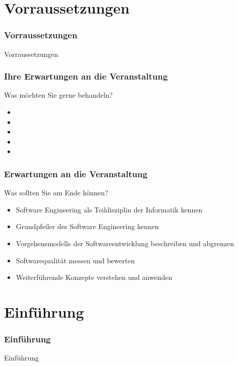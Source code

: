 
\section{Vorraussetzungen}
\begin{frame}[fragile]
	\frametitle{Vorraussetzungen}
\huge Vorraussetzungen
\end{frame}

\begin{frame}
\frametitle{Ihre Erwartungen an die Veranstaltung}
	\begin{exampleblock}{Was m\"ochten Sie gerne behandeln?}
		\begin{itemize}
			 \item{}
			 \item{}
			 \item{}
			 \item{}
			 \item{}
		\end{itemize}
	\end{exampleblock}
\end{frame}

\begin{frame}
\frametitle{Erwartungen an die Veranstaltung}
	\begin{block}{Was sollten Sie am Ende k\"onnen?}
		\begin{itemize}
			 \item{Software Engineering als Teildisziplin der Informatik kennen}
			 \item{Grundpfeiler des Software Engineering kennen}
			 \item{Vorgehensmodelle der Softwareentwicklung beschreiben und abgrenzen}
			 \item{Softwarequalität messen und bewerten}
			 \item{Weiterf\"uhrende Konzepte verstehen und anwenden}
		\end{itemize}
	\end{block}
\end{frame}

\section{Einführung}
\begin{frame}[fragile]
	\frametitle{Einführung}
\huge Einführung
\end{frame}


